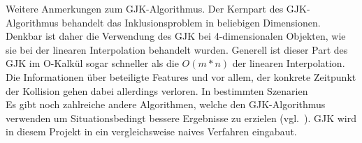 Weitere Anmerkungen zum GJK-Algorithmus.
Der Kernpart des GJK-Algorithmus behandelt das Inklusionsproblem in beliebigen Dimensionen. Denkbar ist daher die Verwendung des GJK bei 4-dimensionalen Objekten, wie sie bei der linearen Interpolation behandelt wurden. Generell ist dieser Part des GJK im O-Kalkül sogar schneller als die $O(m*n)$ der linearen Interpolation. Die Informationen über beteiligte Features und vor allem, der konkrete Zeitpunkt der Kollision gehen dabei allerdings verloren. In bestimmten Szenarien\\
Es gibt noch zahlreiche andere Algorithmen, welche den GJK-Algorithmus verwenden um Situationsbedingt bessere Ergebnisse zu erzielen (vgl.~\cite{gdc-physics}). GJK wird in diesem Projekt in ein vergleichsweise naives Verfahren eingabaut.\\

